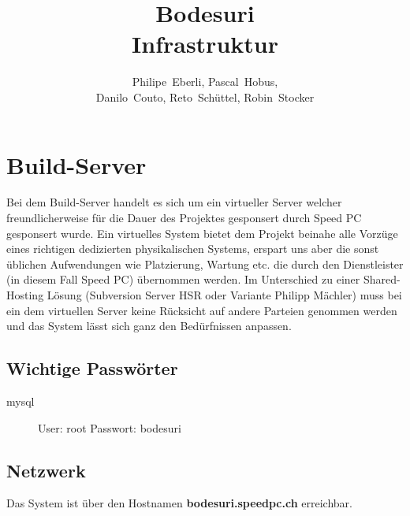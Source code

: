 \documentclass[a4paper,12pt,halfparskip,DIV14]{scrreprt}
\begin{document}
\title{Bodesuri\\Infrastruktur}
\subject{Infastruktur-Dokumentation}
\author{Philipe~Eberli, Pascal~Hobus, \\ Danilo~Couto, Reto~Schüttel, Robin~Stocker}
\maketitle


\tableofcontents
\thispagestyle{plain}
\newpage


\chapter{Build-Server} %
\label{cha:build_server}

Bei dem Build-Server handelt es sich um ein virtueller Server welcher freundlicherweise für die Dauer des Projektes gesponsert durch Speed PC gesponsert wurde. Ein virtuelles System bietet dem Projekt beinahe alle Vorzüge eines richtigen dedizierten physikalischen Systems, erspart uns aber die sonst üblichen Aufwendungen wie Platzierung, Wartung etc. die durch den Dienstleister (in diesem Fall Speed PC) übernommen werden. Im Unterschied zu einer Shared-Hosting Lösung (Subversion Server HSR oder Variante Philipp Mächler) muss bei ein dem virtuellen Server keine Rücksicht auf andere Parteien genommen werden und das System lässt sich ganz den Bedürfnissen anpassen.


\section{Wichtige Passwörter} %
\label{sec:wichtige_passwörter}

\begin{description}
  \item[mysql] User: root Passwort: bodesuri
\end{description}


\section{Netzwerk} %
\label{sec:netzwerk}

Das System ist über den Hostnamen \textbf{bodesuri.speedpc.ch} erreichbar. 
\end{document}
